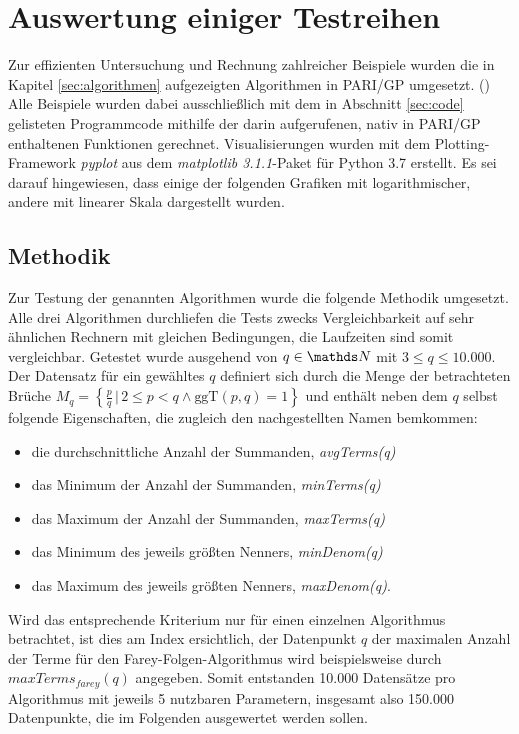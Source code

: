 \section{Auswertung einiger Testreihen}\label{sec:Testreihen}
Zur effizienten Untersuchung und Rechnung zahlreicher Beispiele wurden die in Kapitel \ref{sec:algorithmen} aufgezeigten Algorithmen in PARI/GP umgesetzt. (\cite{PARI2018})\\
Alle Beispiele wurden dabei ausschließlich mit dem in Abschnitt \ref{sec:code} gelisteten Programmcode \bzw mithilfe der darin aufgerufenen, nativ in PARI/GP enthaltenen Funktionen gerechnet.
Visualisierungen wurden mit dem Plotting-Framework \emph{pyplot} aus dem \emph{matplotlib 3.1.1}-Paket für Python 3.7 erstellt. Es sei darauf hingewiesen, dass einige der folgenden Grafiken mit logarithmischer, andere mit linearer Skala dargestellt wurden.

\subsection{Methodik}
Zur Testung der genannten Algorithmen wurde die folgende Methodik umgesetzt.
Alle drei Algorithmen durchliefen die Tests zwecks Vergleichbarkeit auf sehr ähnlichen Rechnern mit gleichen Bedingungen, die Laufzeiten sind somit vergleichbar.
Getestet wurde ausgehend von $q \in \N$ mit $3 \leq q \leq 10.000$.
Der Datensatz für ein gewähltes $q$ definiert sich durch die Menge der betrachteten Brüche $M_q = \left\{ \frac{p}{q} \, | \, 2\leq p < q \wedge \text{ggT}(p,q) = 1\right\}$ und enthält neben dem $q$ selbst folgende Eigenschaften, die zugleich den nachgestellten Namen bemkommen:
\begin{itemize}
	\item die durchschnittliche Anzahl der Summanden, \emph{avgTerms(q)}
	\item das Minimum der Anzahl der Summanden, \emph{minTerms(q)}
	\item das Maximum der Anzahl der Summanden, \emph{maxTerms(q)}
	\item das Minimum des jeweils größten Nenners, \emph{minDenom(q)}
	\item das Maximum des jeweils größten Nenners, \emph{maxDenom(q)}.
\end{itemize}
Wird das entsprechende Kriterium nur für einen einzelnen Algorithmus betrachtet, ist dies am Index ersichtlich, der Datenpunkt $q$ der maximalen Anzahl der Terme für den Farey-Folgen-Algorithmus wird beispielsweise durch $maxTerms_{farey}(q)$ angegeben.
Somit entstanden 10.000 Datensätze pro Algorithmus mit jeweils 5 nutzbaren Parametern, insgesamt also 150.000 Datenpunkte, die im Folgenden ausgewertet werden sollen.

